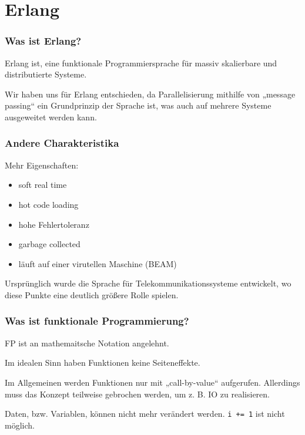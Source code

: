 \documentclass[compress]{beamer}
\begin{document}

\section{Erlang}
\label{sec:erlang}

\begin{frame}
  \frametitle{Was ist Erlang?}

  Erlang ist, eine funktionale Programmiersprache für massiv
  skalierbare und distributierte Systeme.

  Wir haben uns für Erlang entschieden, da Parallelisierung mithilfe
  von „message passing“ ein Grundprinzip der Sprache ist, was auch auf
  mehrere Systeme ausgeweitet werden kann.
\end{frame}

\begin{frame}
  \frametitle{Andere Charakteristika}

  Mehr Eigenschaften:

  \begin{itemize}
  \item soft real time
  \item hot code loading
  \item hohe Fehlertoleranz
  \item garbage collected
  \item läuft auf einer virutellen Maschine (BEAM)
  \end{itemize}

  Ursprünglich wurde die Sprache für Telekommunikationssysteme
  entwickelt, wo diese Punkte eine deutlich größere Rolle spielen.
\end{frame}

\begin{frame}
  \frametitle{Was ist funktionale Programmierung?}

  FP ist an mathemaitsche Notation angelehnt.

  Im idealen Sinn haben Funktionen keine Seiteneffekte.

  Im Allgemeinen werden Funktionen nur mit „call-by-value“ aufgerufen.
  Allerdings muss das Konzept teilweise gebrochen werden, um z. B. IO
  zu realisieren.

  Daten, bzw. Variablen, können nicht mehr verändert
  werden. \lstinline{i += 1} ist nicht möglich. %


\end{frame}
\end{document}

